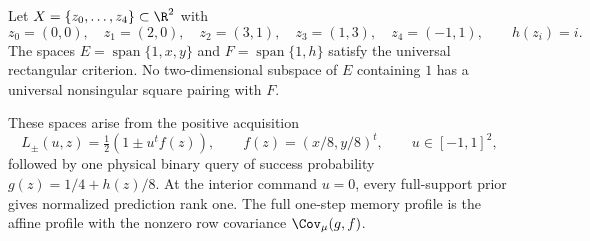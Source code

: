 \begin{proposition}
\label{prop:v19-pentagon}
Let $X=\{z_0,\ldots,z_4\}\subset\R^2$ with
\[
 z_0=(0,0),\quad z_1=(2,0),\quad z_2=(3,1),\quad
 z_3=(1,3),\quad z_4=(-1,1),\qquad h(z_i)=i.
\]
The spaces $E=\operatorname{span}\{1,x,y\}$ and
$F=\operatorname{span}\{1,h\}$ satisfy the universal rectangular
criterion. No two-dimensional subspace of $E$ containing $1$ has a
universal nonsingular square pairing with $F$.

These spaces arise from the positive acquisition
\[
 L_\pm(u,z)=\tfrac12(1\pm u^t f(z)),\qquad
 f(z)=(x/8,y/8)^t,\qquad u\in[-1,1]^2,
\]
followed by one physical binary query of success probability
$g(z)=1/4+h(z)/8$. At the interior command $u=0$, every full-support
prior gives normalized prediction rank one. The full one-step memory
profile is the affine profile with the nonzero row covariance
$\Cov_\mu(g,f)$.
\end{proposition}
